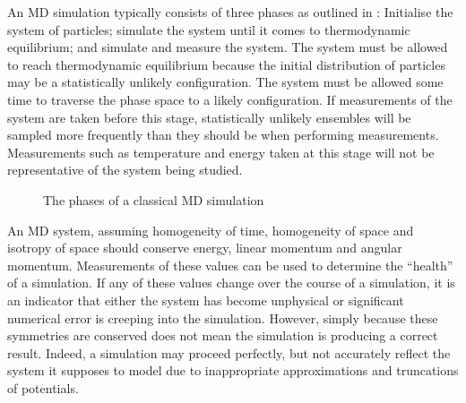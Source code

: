 %
An MD simulation typically consists of three phases as outlined in
:
Initialise the system of particles;
simulate the system until it comes to thermodynamic equilibrium; and
simulate and measure the system.
%
The system must be allowed to reach thermodynamic equilibrium because
the initial distribution of particles may be a statistically unlikely
configuration.
%
The system must be allowed some time to traverse the phase space to
a likely configuration.
%
If measurements of the system are taken before this stage,
statistically unlikely ensembles will be sampled more frequently than
they should be when performing measurements.
%
Measurements such as
temperature and energy
taken at this stage will not be
representative of the system being studied.

\begin{figure}[!h]
    \begin{center}
    \end{center}
    \caption{The phases of a classical MD simulation}
    \label{fig:phases_of_md_simulation}
\end{figure}


%
An MD system,
assuming homogeneity of time,
homogeneity of space and
isotropy of space
should conserve energy, linear momentum and angular momentum.
%
Measurements of these values can be used to
determine the ``health'' of a simulation.
%
If any of these values change over the course of a simulation,
it is an indicator that either the system has become unphysical or
significant numerical error is creeping into the simulation.
%
However, simply because these symmetries are conserved does not mean
the simulation is producing a correct result.
%
Indeed, a simulation may proceed perfectly, but not accurately reflect
the system it supposes to model due to
inappropriate approximations and truncations of potentials.




